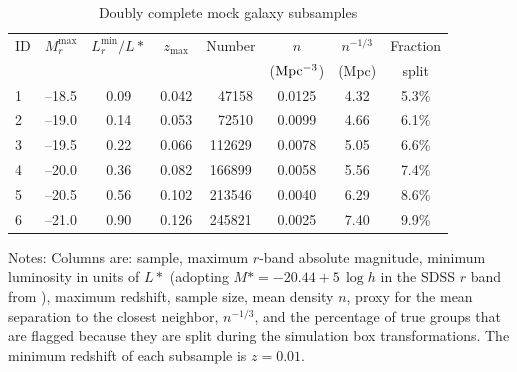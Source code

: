 \begin{table}
\caption{Doubly complete mock galaxy subsamples\label{tab:samples}}
\begin{center}
\setlength{\tabcolsep}{3pt}
\begin{tabular}{lccccccc}
\toprule
\toprule
ID & $M_r^{\max}$ & $L_r^{\min}/L*$ & $z_{ \max }$ & Number & $n$
& $n^{-1/3}$ & Fraction\\
          &            &     &                 &        & ($\rm  Mpc^{-3}$)
& (Mpc) & split\\
\toprule
1 & --18.5 & 0.09 & 0.042 & \ \,47158 & 0.0125 & 4.32 & 5.3\%\\
2 & --19.0 & 0.14 & 0.053 & \ \,72510 & 0.0099 & 4.66 & 6.1\%\\
3 & --19.5 & 0.22 & 0.066 & 112629    & 0.0078 & 5.05 & 6.6\%\\
4 & --20.0 & 0.36 & 0.082 & 166899    & 0.0058 & 5.56 & 7.4\%\\
5 & --20.5 & 0.56 & 0.102 & 213546    & 0.0040 & 6.29 & 8.6\%\\
6 & --21.0 & 0.90 & 0.126 & 245821    & 0.0025 & 7.40 & 9.9\%\\
\bottomrule
\end{tabular}
\end{center}
\parbox{\hsize}{Notes: Columns are: sample, maximum $r$-band absolute
  magnitude, minimum luminosity in units of $L*$
(adopting $M*=-20.44 + 5\,\log h$ in the SDSS $r$ band from \citealp{Blanton+03}),
maximum redshift,
sample size,
mean density $n$, proxy for the mean separation to the closest neighbor,
$n^{-1/3}$, and the percentage of true groups that are flagged because they are
split during the simulation box transformations.
The minimum redshift of each subsample is $z=0.01$.
}
\end{table}
